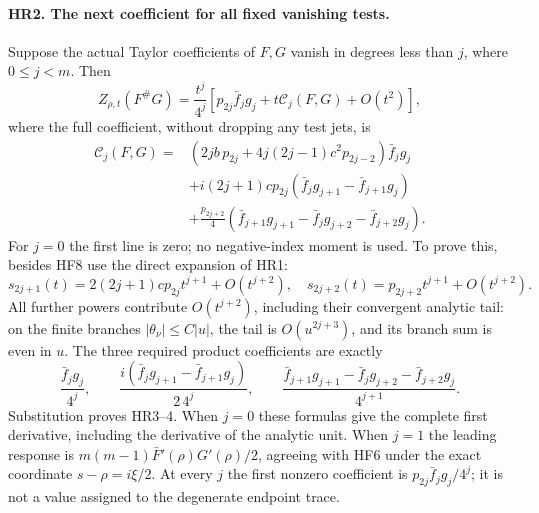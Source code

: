 \paragraph{HR2. The next coefficient for all fixed vanishing tests.}
Suppose the actual Taylor coefficients of $F,G$ vanish in degrees
less than $j$, where $0\le j<m$. Then
\[
 Z_{\rho,t}(F^\#G)=\frac{t^j}{4^j}
       \left[p_{2j}\bar f_j g_j+t\mathcal C_j(F,G)+O(t^2)\right],
 \tag{HR3}
\]
where the full coefficient, without dropping any test jets, is
\[
\begin{split}
 \mathcal C_j(F,G)={}&
 \left(2jb\,p_{2j}+4j(2j-1)c^2p_{2j-2}\right)\bar f_j g_j\\
 &+i(2j+1)c p_{2j}
       (\bar f_j g_{j+1}-\bar f_{j+1}g_j)\\
 &+\frac{p_{2j+2}}4
       (\bar f_{j+1}g_{j+1}-\bar f_jg_{j+2}-\bar f_{j+2}g_j).
\end{split}
 \tag{HR4}
\]
For $j=0$ the first line is zero; no negative-index moment is used.
To prove this, besides HF8 use the direct expansion of HR1:
\[
 s_{2j+1}(t)=2(2j+1)c p_{2j}t^{j+1}+O(t^{j+2}),\quad
 s_{2j+2}(t)=p_{2j+2}t^{j+1}+O(t^{j+2}).
 \tag{HR5}
\]
All further powers contribute $O(t^{j+2})$, including their
convergent analytic tail: on the finite branches $|\theta_\nu|\le C|u|$,
the tail is $O(u^{2j+3})$, and its branch sum is even in $u$.
The three required product coefficients are exactly
\[
 \frac{\bar f_jg_j}{4^j},\qquad
 \frac{i(\bar f_jg_{j+1}-\bar f_{j+1}g_j)}{2\,4^j},\qquad
 \frac{\bar f_{j+1}g_{j+1}-\bar f_jg_{j+2}-\bar f_{j+2}g_j}{4^{j+1}}.
 \tag{HR6}
\]
Substitution proves HR3--4. When $j=0$ these formulas give the
complete first derivative, including the derivative of the analytic
unit. When $j=1$ the leading response is
$m(m-1)\bar F'(\rho)G'(\rho)/2$, agreeing with HF6 under the exact
coordinate $s-\rho=i\xi/2$. At every $j$ the first nonzero
coefficient is $p_{2j}\bar f_jg_j/4^j$; it is not a value assigned
to the degenerate endpoint trace.

